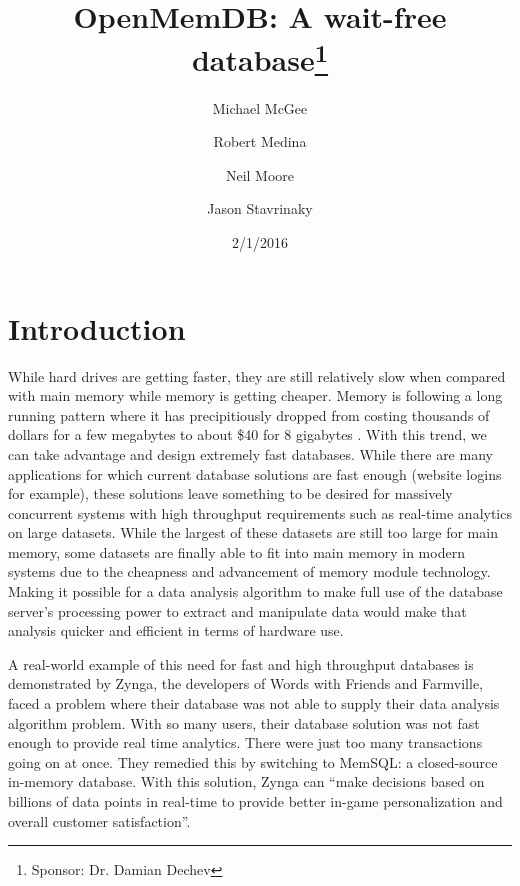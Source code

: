 \documentclass[letter,11pt]{article}
\title{OpenMemDB: A wait-free database\thanks{Sponsor: Dr. Damian Dechev}}
\author{Michael McGee \and Robert Medina \and Neil Moore \and Jason Stavrinaky}
\date{2/1/2016}
\begin{document}
\maketitle
\newpage

\tableofcontents
\newpage


\section{Introduction}
While hard drives are getting faster, they are still relatively slow when compared 
with main memory while memory is getting cheaper. Memory is following a long running 
pattern where it has precipitiously dropped from costing thousands of dollars for a few 
megabytes to about \$40 for 8 gigabytes \cite{jcmit}. With this trend, we can take 
advantage and design extremely fast databases. While there are many applications for 
which current database solutions are fast enough (website logins for example), these 
solutions leave something to be desired for massively concurrent systems with high throughput
requirements such as real-time analytics on large datasets. While the largest of 
these datasets are still too large for main memory, some datasets are finally able
to fit into main memory in modern systems due to the cheapness and advancement of 
memory module technology. Making it possible for a data analysis algorithm to make 
full use of the database server's processing power to extract and manipulate data
would make that analysis quicker and efficient in terms of hardware use.
\par\vspace{\baselineskip}
A real-world example of this need for fast and high throughput databases is demonstrated by Zynga, 
the developers of Words with Friends and Farmville, faced a problem where their 
database was not able to supply their data analysis algorithm problem. With so 
many users, their database solution was not fast enough to provide real time analytics. 
There were just too many transactions going on at once. They 
remedied this by switching to MemSQL: a closed-source in-memory database. With this 
solution, Zynga can ``make decisions based on billions of data points in real-time to 
provide better in-game personalization and overall customer satisfaction''. \cite{MemSQL} 
\end{document}
